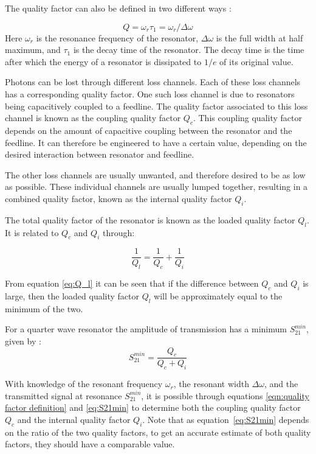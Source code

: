     The quality factor can also be defined in two different ways \cite[pp.23-24]{Mazin}:

    \begin{equation}
        Q = \omega_r \tau_1 = \omega_r / \Delta \omega
        \label{eqn:quality factor definition}
    \end{equation}
    Here $\omega_r$ is the resonance frequency of the resonator, $\Delta \omega$ is the full width at half maximum, and $\tau_1$ is the decay time of the resonator. The decay time is the time after which the energy of a resonator is dissipated to $1/e$ of its original value.

    Photons can be lost through different loss channels. Each of these loss channels has a corresponding quality factor. One such loss channel is due to resonators being capacitively coupled to a feedline. The quality factor associated to this loss channel is known as the coupling quality factor $Q_c$. This coupling quality factor depends on the amount of capacitive coupling between the resonator and the feedline. It can therefore be engineered to have a certain value, depending on the desired interaction between resonator and feedline.

    The other loss channels are usually unwanted, and therefore desired to be as low as possible. These individual channels are usually lumped together, resulting in a combined quality factor, known as the internal quality factor $Q_i$.

    The total quality factor of the resonator is known as the loaded quality factor $Q_l$. It is related to $Q_c$ and $Q_i$ through:

    \begin{equation}
        \frac{1}{Q_l} = \frac{1}{Q_c} + \frac{1}{Q_i}
        \label{eq:Q_l}
    \end{equation}

    From equation \ref{eq:Q_l} it can be seen that if the difference between $Q_c$ and $Q_i$ is large, then the loaded quality factor $Q_l$ will be approximately equal to the minimum of the two.


    For a quarter wave resonator the amplitude of transmission has a minimum $S_{21}^{min}$, given by \cite[p29]{Mazin}:
    \begin{equation}
        S_{21}^{min} = \frac{Q_c}{Q_c + Q_i}
        \label{eq:S21min}
    \end{equation}

    With knowledge of the resonant frequency $\omega_r$, the resonant width $\Delta \omega$, and the transmitted signal at resonance $S_{21}^{min}$, it is possible through equations \ref{eqn:quality factor definition} and \ref{eq:S21min} to determine both the coupling quality factor $Q_c$ and the internal quality factor $Q_i$. Note that as equation~\ref{eq:S21min} depends on the ratio of the two quality factors, to get an accurate estimate of both quality factors, they should have a comparable value.

